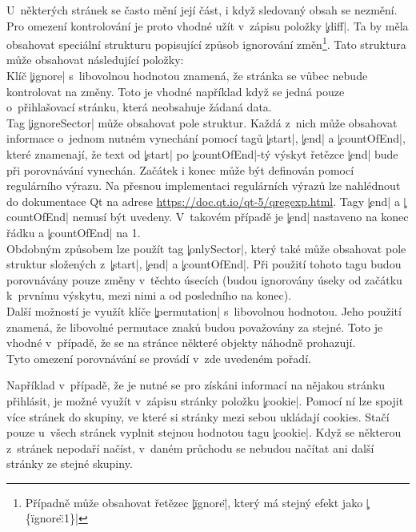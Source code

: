 U~některých stránek se často mění její část, i když sledovaný obsah se nezmění.
Pro omezení kontrolování je proto vhodné užít v~zápisu položky \c|diff|.
Ta by měla obsahovat speciální strukturu  popisující způsob ignorování změn\footnote{Případně může obsahovat řetězec \c|\"ignore\"|, který má stejný efekt jako \c|\{\"ignore\":1\}|}.
Tato struktura může obsahovat následující položky:\\
Klíč \c|ignore| s~libovolnou hodnotou znamená, že stránka se vůbec nebude kontrolovat na změny.
Toto je vhodné například když se jedná pouze o~přihlašovací stránku, která neobsahuje žádaná data.\\
Tag \c|ignoreSector| může obsahovat pole struktur.
Každá z~nich může obsahovat informace o~jednom nutném vynechání pomocí tagů \c|start|, \c|end| a \c|countOfEnd|,
které znamenají, že text od \c|start| po \c|countOfEnd|-tý výskyt řetězce \c|end| bude při porovnávání vynechán.
Začátek i konec může být definován pomocí regulárního výrazu.
Na přesnou implementaci regulárních výrazů lze nahlédnout do dokumentace Qt na adrese
\url{https://doc.qt.io/qt-5/qregexp.html}.
Tagy \c|end| a \c|countOfEnd| nemusí být uvedeny. V~takovém případě je \c|end| nastaveno na konec řádku a \c|countOfEnd| na 1.
\\
Obdobným způsobem lze použít tag \c|onlySector|, který také může obsahovat pole struktur složených z~\c|start|, \c|end| a \c|countOfEnd|.
Při použití tohoto tagu budou porovnávány pouze změny v~těchto úsecích (budou ignorovány úseky od začátku k~prvnímu výskytu, mezi nimi a od posledního na konec).
\\
Další možností je využít klíče \c|permutation| s~libovolnou hodnotou.
Jeho použití znamená, že libovolné permutace znaků budou považovány za stejné.
Toto je vhodné v~případě, že se na stránce některé objekty náhodně prohazují.
\\
Tyto omezení porovnávání se provádí v~zde uvedeném pořadí.




Například v~případě, že je nutné se pro získáni informací na nějakou stránku přihlásit, je možné využít v~zápisu stránky položku \c|cookie|.
Pomocí ní lze spojit více stránek do skupiny, ve které si stránky mezi sebou ukládají cookies.
Stačí pouze u~všech stránek vyplnit stejnou hodnotou tagu \c|cookie|.
Když se některou z~stránek nepodaří načíst, v~daném průchodu se nebudou načítat ani další stránky ze stejné skupiny.
